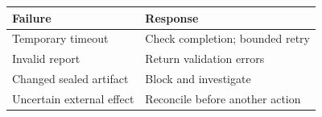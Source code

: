 \begin{tabular}{@{}P{4.0cm}P{8.5cm}@{}}
\toprule
\textbf{Failure} & \textbf{Response} \\
\midrule
Temporary timeout & Check completion; bounded retry \\
Invalid report & Return validation errors \\
Changed sealed artifact & Block and investigate \\
Uncertain external effect & Reconcile before another action \\
\bottomrule
\end{tabular}
